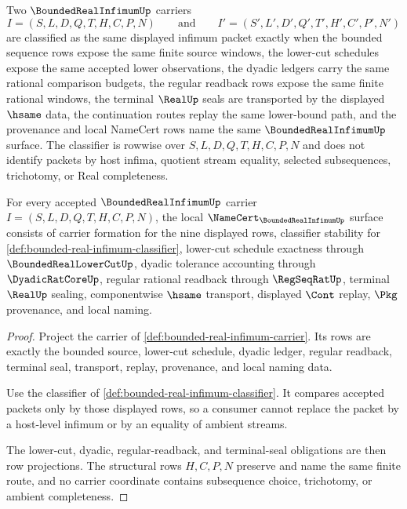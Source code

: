\begin{definition}
\label{def:bounded-real-infimum-classifier}
Two $\BoundedRealInfimumUp$ carriers
$$
I=(S,L,D,Q,T,H,C,P,N)
\qquad\text{and}\qquad
I'=(S',L',D',Q',T',H',C',P',N')
$$
are classified as the same displayed infimum packet exactly when the bounded sequence rows expose the same finite source windows, the lower-cut schedules expose the same accepted lower observations, the dyadic ledgers carry the same rational comparison budgets, the regular readback rows expose the same finite rational windows, the terminal $\RealUp$ seals are transported by the displayed $\hsame$ data, the continuation routes replay the same lower-bound path, and the provenance and local NameCert rows name the same $\BoundedRealInfimumUp$ surface. The classifier is rowwise over $S,L,D,Q,T,H,C,P,N$ and does not identify packets by host infima, quotient stream equality, selected subsequences, trichotomy, or Real completeness.
\end{definition}

\begin{theorem}
\label{thm:bounded-real-infimum-namecert-obligations}
For every accepted $\BoundedRealInfimumUp$ carrier $I=(S,L,D,Q,T,H,C,P,N)$, the local $\NameCert_{\BoundedRealInfimumUp}$ surface consists of carrier formation for the nine displayed rows, classifier stability for \autoref{def:bounded-real-infimum-classifier}, lower-cut schedule exactness through $\BoundedRealLowerCutUp$, dyadic tolerance accounting through $\DyadicRatCoreUp$, regular rational readback through $\RegSeqRatUp$, terminal $\RealUp$ sealing, componentwise $\hsame$ transport, displayed $\Cont$ replay, $\Pkg$ provenance, and local naming.
\end{theorem}
\begin{proof}
Project the carrier of \autoref{def:bounded-real-infimum-carrier}. Its rows are exactly the bounded source, lower-cut schedule, dyadic ledger, regular readback, terminal seal, transport, replay, provenance, and local naming data.

Use the classifier of \autoref{def:bounded-real-infimum-classifier}. It compares accepted packets only by those displayed rows, so a consumer cannot replace the packet by a host-level infimum or by an equality of ambient streams.

The lower-cut, dyadic, regular-readback, and terminal-seal obligations are then row projections. The structural rows $H,C,P,N$ preserve and name the same finite route, and no carrier coordinate contains subsequence choice, trichotomy, or ambient completeness.
\end{proof}

